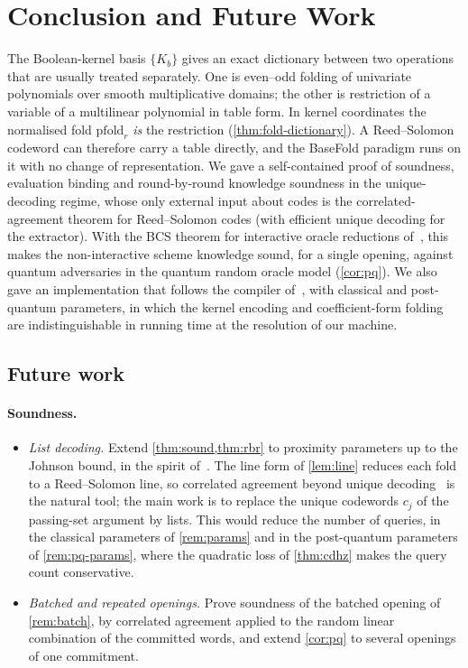 \section{Conclusion and Future Work}\label{sec:concl}

The Boolean-kernel basis $\{K_b\}$ gives an exact dictionary between two operations that are usually treated separately.
One is even--odd folding of univariate polynomials over smooth multiplicative domains; the other is restriction of a variable of a multilinear polynomial in table form.
In kernel coordinates the normalised fold $\mathrm{pfold}_r$ \emph{is} the restriction (\cref{thm:fold-dictionary}).
A Reed--Solomon codeword can therefore carry a table directly, and the BaseFold paradigm runs on it with no change of representation.
We gave a self-contained proof of soundness, evaluation binding and round-by-round knowledge soundness in the unique-decoding regime, whose only external input about codes is the correlated-agreement theorem for Reed--Solomon codes (with efficient unique decoding for the extractor).
With the BCS theorem for interactive oracle reductions of~\cite{CDHZ25}, this makes the non-interactive scheme knowledge sound, for a single opening, against quantum adversaries in the quantum random oracle model (\cref{cor:pq}).
We also gave an implementation that follows the compiler of~\cite{CDHZ25}, with classical and post-quantum parameters, in which the kernel encoding and coefficient-form folding are indistinguishable in running time at the resolution of our machine.

\subsection{Future work}\label{sec:concl:future}

\paragraph{Soundness.}
\begin{itemize}
  \item \emph{List decoding.} Extend \cref{thm:sound,thm:rbr} to proximity parameters up to the Johnson bound, in the spirit of~\cite{Hab24,Zei26}. The line form of \cref{lem:line} reduces each fold to a Reed--Solomon line, so correlated agreement beyond unique decoding~\cite{BCIKS23} is the natural tool; the main work is to replace the unique codewords $c_j$ of the passing-set argument by lists. This would reduce the number of queries, in the classical parameters of \cref{rem:params} and in the post-quantum parameters of \cref{rem:pq-params}, where the quadratic loss of \cref{thm:cdhz} makes the query count conservative.
  \item \emph{Batched and repeated openings.} Prove soundness of the batched opening of \cref{rem:batch}, by correlated agreement applied to the random linear combination of the committed words, and extend \cref{cor:pq} to several openings of one commitment.
\end{itemize}

